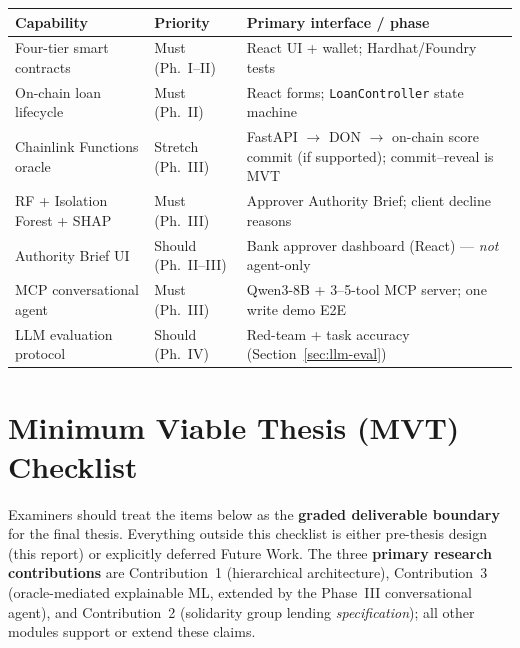 \documentclass[12pt,a4paper]{report}
\newcommand{\tableheadcolor}{\rowcolor{TableHeadBg}}
\begin{document}
\begin{table}[H]
\centering
\begin{tabular}{p{3.2cm}p{2.2cm}p{7.8cm}}
\toprule
\tableheadcolor
\textbf{Capability} & \textbf{Priority} & \textbf{Primary interface / phase} \\
\midrule
Four-tier smart contracts & Must (Ph.~I--II) & React UI + wallet; Hardhat/Foundry tests \\
On-chain loan lifecycle & Must (Ph.~II) & React forms; \texttt{LoanController} state machine \\
Chainlink Functions oracle & Stretch (Ph.~III) & FastAPI $\to$ DON $\to$ on-chain score commit (if supported); commit--reveal is MVT \\
RF + Isolation Forest + SHAP & Must (Ph.~III) & Approver Authority Brief; client decline reasons \\
Authority Brief UI & Should (Ph.~II--III) & Bank approver dashboard (React) --- \textit{not} agent-only \\
MCP conversational agent & Must (Ph.~III) & Qwen3-8B + 3--5-tool MCP server; one write demo E2E \\
LLM evaluation protocol & Should (Ph.~IV) & Red-team + task accuracy (Section~\ref{sec:llm-eval}) \\
\bottomrule
\end{tabular}
\end{table}

\section{Minimum Viable Thesis (MVT) Checklist}
\label{sec:mvt-checklist}

Examiners should treat the items below as the \textbf{graded deliverable boundary} for the final thesis. Everything outside this checklist is either pre-thesis design (this report) or explicitly deferred Future Work. The three \textbf{primary research contributions} are Contribution~1 (hierarchical architecture), Contribution~3 (oracle-mediated explainable ML, extended by the Phase~III conversational agent), and Contribution~2 (solidarity group lending \textit{specification}); all other modules support or extend these claims.
\end{document}
